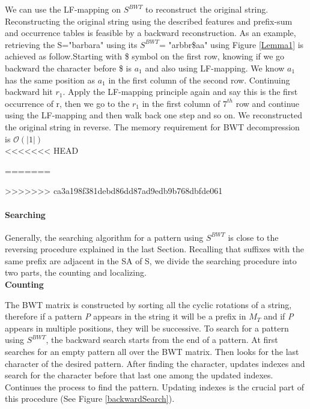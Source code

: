 \documentclass[11pt,a4paper]{report}
\begin{document}
We can use the LF-mapping on $S^{ BWT}$ to reconstruct the original string. 
Reconstructing the original string using the described features and prefix-sum
and occurrence tables is feasible by a backward reconstruction. As an example, 
retrieving the S="barbara" using its $S^{BWT}$= "arbbr\$aa" using Figure 
\ref{Lemma1} is achieved as follow.Starting with \$ symbol on the first row, 
knowing if we go backward the character before \$ is $a_1$ and also using 
LF-mapping. We know $a_1$ has the same position as $a_1$ in the first column of
the second row. Continuing backward hit $r_1$. Apply the LF-mapping principle 
again and say this is the first occurrence of r, then we go to the  $r_1$ in 
the first column of $7^{th}$ row and continue using the LF-mapping and then walk
back one step and so on. We reconstructed the original string in reverse. 
The memory requirement for BWT decompression is $\mathcal{O}(\lvert 1 \rvert)$ \\
<<<<<<< HEAD


=======


>>>>>>> ca3a198f381debd86dd87ad9edb9b768dbfde061

\paragraph{Searching}

Generally, the searching algorithm for a pattern using $S^{BWT}$ is close to
the reversing procedure explained in the last Section. Recalling that suffixes 
with the same prefix are adjacent in the SA of S, we divide the searching procedure 
into two parts, the counting and localizing.\\


\textbf{Counting}

The BWT matrix is constructed by sorting all the cyclic rotations of a string, 
therefore if a pattern \emph{P} appears in the string it will be a prefix in $M_{T}$ 
and if \emph {P} appears in multiple positions, they will be successive. To search 
for a pattern using $S^{BWT}$, the backward search starts from the end of a pattern.
At first searches for an empty  pattern all over the BWT matrix. Then looks for the 
last character of the desired pattern. After finding the character, updates indexes 
and search for the character before that last one among the updated indexes.
Continues the process to find the pattern. Updating indexes is the crucial part 
of this procedure (See Figure \ref{backwardSearch}).\\\\
\end{document}
